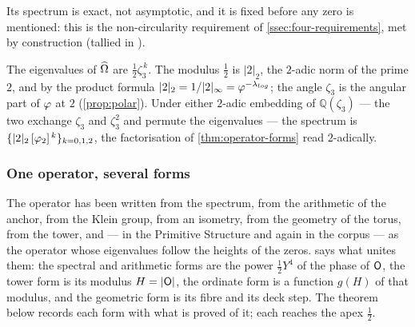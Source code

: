 Its spectrum is exact, not asymptotic, and it is fixed before any zero is
mentioned: this is the non-circularity requirement of
\cref{ssec:four-requirements}, met by construction
(tallied in ).

\begin{proposition}\label{prop:omega-two-adic}
The eigenvalues of $\widehat{\Omega}$ are $\tfrac12\zeta_3^{\,k}$.  The modulus $\tfrac12$ is $|2|_2$, the $2$-adic norm of the
prime $2$, and by the product formula $|2|_2=1/|2|_\infty=\varphi^{-\lambda_{log}}$; the angle $\zeta_3$ is the angular part of $\varphi$ at $2$ (\cref{prop:polar}).  Under either $2$-adic embedding of $\mathbb{Q}(\zeta_3)$ --- the two exchange $\zeta_3$ and $\zeta_3^2$ and permute the eigenvalues --- the spectrum is
$\{|2|_2\,[\varphi_2]^{\,k}\}_{k=0,1,2}$, the factorisation of \cref{thm:operator-forms} read $2$-adically.

\end{proposition}

\subsubsection{One operator, several forms}\label{ssec:operator-forms}

The operator has been written from the spectrum,
from the arithmetic of the anchor, from the Klein group, from an isometry, from the
geometry of the torus, from the tower, and --- in the Primitive Structure and again
in the corpus --- as the operator whose eigenvalues follow the heights of the zeros.
 says what unites them: the spectral and arithmetic forms are the power
$\tfrac12Y^4$ of the phase of $\mathsf{O}$, the tower form is its modulus $H=|\mathsf{O}|$, the ordinate form is a function
$g(H)$ of that modulus, and the geometric form is its fibre and its deck step.  The theorem below records each form
with what is proved of it; each reaches the apex $\tfrac12$.

